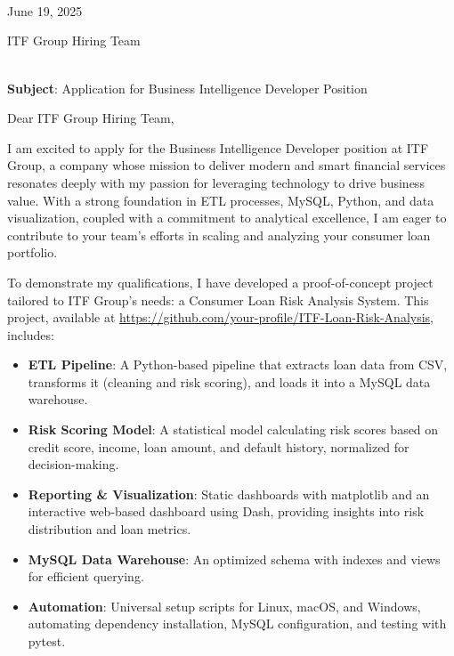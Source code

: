 \documentclass[a4paper,12pt]{article}
\begin{document}
\begin{flushright}
 \\
[Your Email] \\
[Your Phone] \\
June 19, 2025
\end{flushright}

\begin{flushleft}
ITF Group Hiring Team \\
[Company Address, if known] \\
\end{flushleft}

\textbf{Subject}: Application for Business Intelligence Developer Position

Dear ITF Group Hiring Team,

I am excited to apply for the Business Intelligence Developer position at ITF Group, a company whose mission to deliver modern and smart financial services resonates deeply with my passion for leveraging technology to drive business value. With a strong foundation in ETL processes, MySQL, Python, and data visualization, coupled with a commitment to analytical excellence, I am eager to contribute to your team’s efforts in scaling and analyzing your consumer loan portfolio.

To demonstrate my qualifications, I have developed a proof-of-concept project tailored to ITF Group’s needs: a Consumer Loan Risk Analysis System. This project, available at \url{https://github.com/your-profile/ITF-Loan-Risk-Analysis}, includes:

\begin{itemize}
    \item \textbf{ETL Pipeline}: A Python-based pipeline that extracts loan data from CSV, transforms it (cleaning and risk scoring), and loads it into a MySQL data warehouse.
    \item \textbf{Risk Scoring Model}: A statistical model calculating risk scores based on credit score, income, loan amount, and default history, normalized for decision-making.
    \item \textbf{Reporting \& Visualization}: Static dashboards with matplotlib and an interactive web-based dashboard using Dash, providing insights into risk distribution and loan metrics.
    \item \textbf{MySQL Data Warehouse}: An optimized schema with indexes and views for efficient querying.
    \item \textbf{Automation}: Universal setup scripts for Linux, macOS, and Windows, automating dependency installation, MySQL configuration, and testing with pytest.
\end{itemize}
\end{document}
